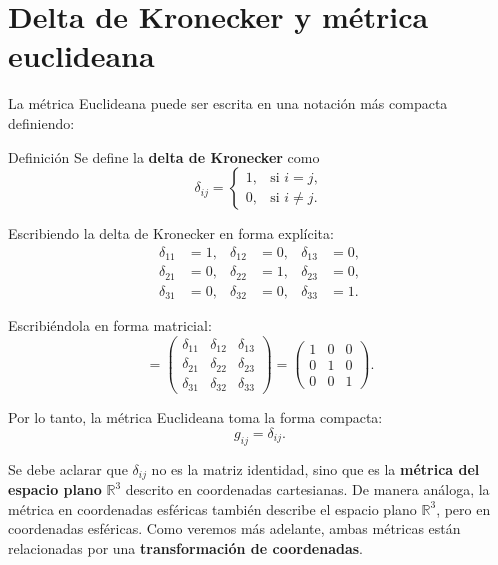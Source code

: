 \documentclass[../apunte_mecanica_clasica.tex]{subfiles}%
\begin{document}
\newpage

\section{Delta de Kronecker y métrica euclideana}

La métrica Euclideana puede ser escrita en una notación más 
compacta definiendo:

\begin{apuntebloque}{Definición}
Se define la \textbf{delta de Kronecker} como
\begin{equation*}
\delta_{ij} =
\begin{cases}
    1, & \text{si } i = j, \\[6pt]
    0, & \text{si } i \neq j.
\end{cases}
\end{equation*}
\end{apuntebloque}

Escribiendo la delta de Kronecker en forma explícita:
\begin{align*}
    \delta_{11} &= 1, & \delta_{12} &= 0, & \delta_{13} &= 0, \\
    \delta_{21} &= 0, & \delta_{22} &= 1, & \delta_{23} &= 0, \\
    \delta_{31} &= 0, & \delta_{32} &= 0, & \delta_{33} &= 1.
\end{align*}

Escribiéndola en forma matricial:
\begin{equation*}
    [\delta_{ij}] =
    \begin{pmatrix}
        \delta_{11} & \delta_{12} & \delta_{13} \\
        \delta_{21} & \delta_{22} & \delta_{23} \\
        \delta_{31} & \delta_{32} & \delta_{33}
    \end{pmatrix}
    =
    \begin{pmatrix}
        1 & 0 & 0 \\
        0 & 1 & 0 \\
        0 & 0 & 1
    \end{pmatrix}.
\end{equation*}

Por lo tanto, la métrica Euclideana toma la forma compacta:
\begin{equation*}
    g_{ij} = \delta_{ij}.
\end{equation*}

Se debe aclarar que $\delta_{ij}$ no es la matriz identidad, 
sino que es la \textbf{métrica del espacio plano} $\mathbb{R}^3$ 
descrito en coordenadas cartesianas.  
De manera análoga, la métrica en coordenadas esféricas también 
describe el espacio plano $\mathbb{R}^3$, pero en coordenadas 
esféricas.  
Como veremos más adelante, ambas métricas están relacionadas 
por una \textbf{transformación de coordenadas}.
\end{document}
